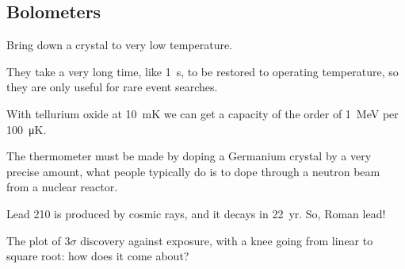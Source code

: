 \documentclass[main.tex]{subfiles}
\begin{document}
\subsection{Bolometers}


Bring down a crystal to very low temperature. 

They take a very long time, like \SI{1}{s}, to be restored to 
operating temperature, so they are only useful for rare event searches. 

With tellurium oxide at \SI{10}{mK} 
we can get a capacity of the order of \SI{1}{MeV} per \SI{100}{\micro K}. 

The thermometer must be made by doping a Germanium crystal by a very precise amount, 
what people typically do is to dope through a neutron beam from a nuclear reactor. 

Lead 210 is produced by cosmic rays, and it decays in \SI{22}{yr}. 
So, Roman lead! 

The plot of \(3 \sigma \) discovery against exposure, 
with a knee going from linear to square root: how does it come about? 
\end{document}
